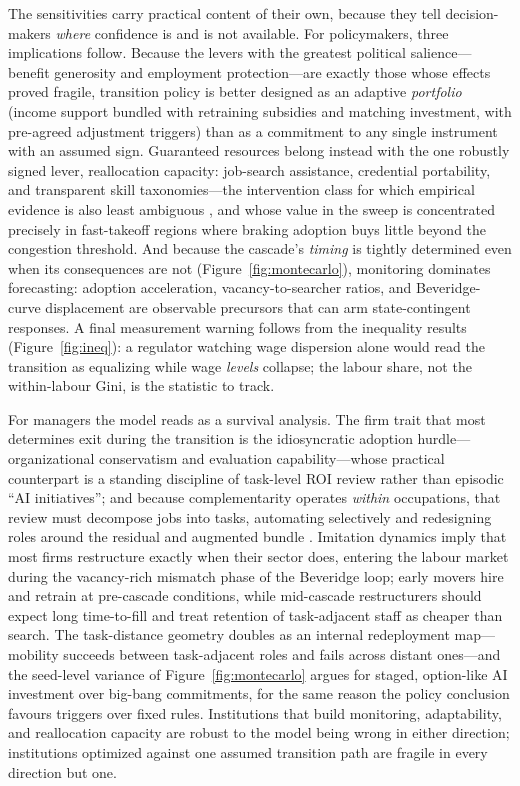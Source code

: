 \documentclass[11pt,a4paper]{article}
\begin{document}
The sensitivities carry practical content of their own, because they tell decision-makers
\emph{where} confidence is and is not available. For policymakers, three implications
follow. Because the levers with the greatest political salience---benefit generosity and
employment protection---are exactly those whose effects proved fragile, transition policy
is better designed as an adaptive \emph{portfolio} (income support bundled with retraining
subsidies and matching investment, with pre-agreed adjustment triggers) than as a
commitment to any single instrument with an assumed sign. Guaranteed resources belong
instead with the one robustly signed lever, reallocation capacity: job-search assistance,
credential portability, and transparent skill taxonomies---the intervention class for
which empirical evidence is also least ambiguous \citep{card2018works}, and whose value
in the sweep is concentrated precisely in fast-takeoff regions where braking adoption
buys little beyond the congestion threshold. And because the cascade's \emph{timing} is
tightly determined even when its consequences are not
(Figure~\ref{fig:montecarlo}), monitoring dominates forecasting: adoption acceleration,
vacancy-to-searcher ratios, and Beveridge-curve displacement are observable precursors
that can arm state-contingent responses. A final measurement warning follows from
the inequality results (Figure~\ref{fig:ineq}): a regulator watching wage dispersion
alone would read the transition as equalizing while wage \emph{levels} collapse; the
labour share, not the within-labour Gini, is the statistic to track.

For managers the model reads as a survival analysis. The firm trait that most determines
exit during the transition is the idiosyncratic adoption hurdle---organizational
conservatism and evaluation capability---whose practical counterpart is a standing
discipline of task-level ROI review rather than episodic ``AI initiatives''; and because
complementarity operates \emph{within} occupations, that review must decompose jobs into
tasks, automating selectively and redesigning roles around the residual and augmented
bundle \citep{autor2015why}. Imitation dynamics imply that most firms restructure exactly
when their sector does, entering the labour market during the vacancy-rich mismatch phase
of the Beveridge loop; early movers hire and retrain at pre-cascade conditions, while
mid-cascade restructurers should expect long time-to-fill and treat retention of
task-adjacent staff as cheaper than search. The task-distance geometry doubles as an
internal redeployment map---mobility succeeds between task-adjacent roles and fails
across distant ones---and the seed-level variance of Figure~\ref{fig:montecarlo} argues
for staged, option-like AI investment over big-bang commitments, for the same reason the
policy conclusion favours triggers over fixed rules. Institutions that build monitoring,
adaptability, and reallocation capacity are robust to the model being wrong in either
direction; institutions optimized against one assumed transition path are fragile in
every direction but one.
\end{document}
